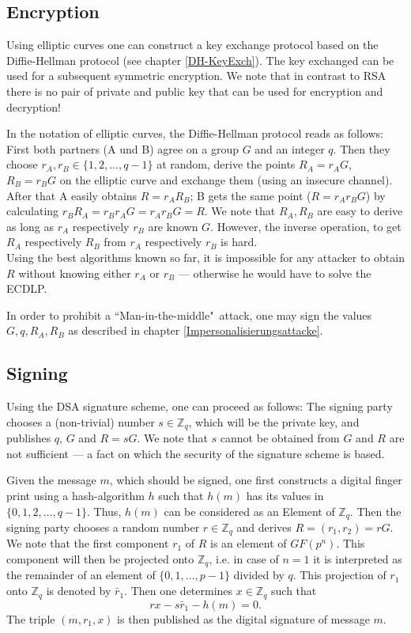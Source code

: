\par
\subsection{Encryption}

Using elliptic curves one can construct a key exchange protocol based on the Diffie-Hellman protocol  (see chapter \ref{DH-KeyExch}). The key exchanged can be used for a subsequent symmetric encryption. We note that in contrast to RSA there is no pair of private and public key that can be used for encryption and decryption!

In the notation of elliptic curves, the Diffie-Hellman protocol reads as follows: First both partners (A und B) agree on a group $G$ and an integer $q$. Then they choose $r_A,r_B\in\{1,2,\dots,q-1\}$ at random, derive the points $R_A=r_AG$, $R_B=r_BG$ on the elliptic curve and exchange them (using an insecure channel). After that A easily obtains $R=r_AR_B$; B gets the same point ($R=r_Ar_B G$) by calculating $r_BR_A=r_Br_AG=r_Ar_BG=R$. We note that $R_A,R_B$ are easy to derive as long as $r_A$ respectively $r_B$ are known $G$. However, the inverse operation, to get $R_A$ respectively $R_B$ from $r_A$ respectively $r_B$ is hard.
\\ Using the best algorithms known so far, it is impossible for any attacker to obtain $R$ without knowing either $r_A$ or $r_B$ --- otherwise he would have to solve the ECDLP.

In order to prohibit a ``Man-in-the-middle"{}~attack, one may sign the values $G,q,R_A,R_B$ as described in chapter \ref{Impersonalisierungsattacke}.


\par
\subsection{Signing}

Using the  DSA signature scheme, one can proceed as follows: The signing party chooses a (non-trivial) number $s\in{\mathbb Z}_q$, which will be the private key, and publishes $q$, $G$ and $R=sG$. We note that $s$ cannot be obtained from $G$ and $R$ are not sufficient --- a fact on which the security of the signature scheme is based.

Given the message $m$, which should be signed, one first constructs a digital finger print using a hash-algorithm $h$ such that $h(m)$ has its values in $\{0,1,2,\dots, q-1\}$. Thus, $h(m)$ can be considered as an Element of ${\mathbb Z}_q$. Then the signing party chooses a random number $r\in{\mathbb Z}_q$ and derives $R=(r_1,r_2)=rG$. We note that the first component $r_1$ of $R$ is an element of $GF(p^n)$. This component will then be projected onto ${\mathbb Z}_q$, i.e. in case of $n=1$ it is interpreted as the remainder of an element of $\{0,1,\dots,p-1\}$ divided by $q$. This projection of $r_1$ onto ${\mathbb Z}_q$ is denoted by $\bar r_1$. Then one determines $x\in {\mathbb Z}_q$ such that
$$ rx-s\bar r_1-h(m)=0 .
$$
The triple $(m,r_1,x)$ is then published as the digital signature of message $m$.

